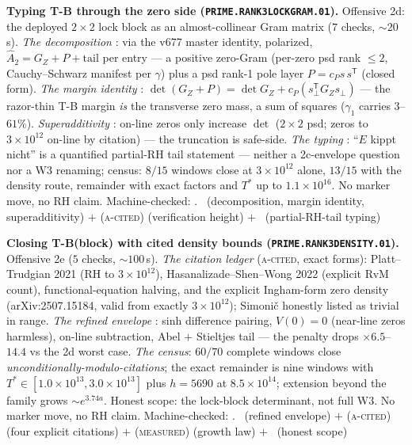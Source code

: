 \documentclass[11pt,a4paper]{article}
\theoremstyle{definition}
\begin{document}
\par\smallskip\noindent\textbf{Typing T-B through the zero side
(\texttt{PRIME.RANK3LOCKGRAM.01}).}
Offensive 2d: the deployed $2\times2$ lock block as an
almost-collinear Gram matrix ($7$ checks, ${\sim}20$\,s).  \emph{The
decomposition} \mE: via the v677 master identity, polarized,
$\hat A_2=G_Z+P+\mathrm{tail}$ per entry --- a positive zero-Gram
(per-zero psd rank $\le2$, Cauchy--Schwarz manifest per $\gamma$)
plus a psd rank-1 pole layer $P=c_Ps\,s^{\mathsf T}$ (closed form).
\emph{The margin identity} \mE:
$\det(G_Z+P)=\det G_Z+c_P(s_\perp^{\mathsf T}G_Zs_\perp)$ --- the
razor-thin T-B margin \emph{is} the transverse zero mass, a sum of
squares ($\gamma_1$ carries $3$--$61\%$).  \emph{Superadditivity}
\mE: on-line zeros only increase $\det$ ($2\times2$ psd; zeros to
$3\times10^{12}$ on-line by citation) --- the truncation is
safe-side.  \emph{The typing} \mC: ``$E$ kippt nicht'' is a
quantified partial-RH tail statement --- neither a 2c-envelope
question nor a W3 renaming; census: $8/15$ windows close at
$3\times10^{12}$ alone, $13/15$ with the density route, remainder
with exact factors and $T^*$ up to $1.1\times10^{16}$.  No marker
move, no RH claim.
Machine-checked: .
\mE\ (decomposition, margin identity, superadditivity) $+$
(\textsc{a-cited}) (verification height) $+$ \mC\ (partial-RH-tail
typing)
\par\smallskip

\par\smallskip\noindent\textbf{Closing T-B(block) with cited density
bounds (\texttt{PRIME.RANK3DENSITY.01}).}
Offensive 2e ($5$ checks, ${\sim}100$\,s).  \emph{The citation
ledger} (\textsc{a-cited}, exact forms): Platt--Trudgian 2021 (RH to
$3\times10^{12}$), Hasanalizade--Shen--Wong 2022 (explicit RvM
count), functional-equation halving, and the explicit Ingham-form
zero density (arXiv:2507.15184, valid from exactly
$3\times10^{12}$); Simoni\v{c} honestly listed as trivial in range.
\emph{The refined envelope} \mE: sinh difference pairing, $V(0)=0$
(near-line zeros harmless), on-line subtraction, Abel $+$ Stieltjes
tail --- the penalty drops $\times6.5$--$14.4$ vs the 2d worst case.
\emph{The census}: $60/70$ complete windows close
\emph{unconditionally-modulo-citations}; the exact remainder is nine
windows with $T^*\in[1.0\times10^{13},3.0\times10^{13}]$ plus
$h=5690$ at $8.5\times10^{14}$; extension beyond the family grows
${\sim}e^{3.74a}$.  Honest scope: the lock-block determinant, not
full W3.  No marker move, no RH claim.
Machine-checked: .
\mE\ (refined envelope) $+$ (\textsc{a-cited}) (four explicit
citations) $+$ (\textsc{measured}) (growth law) $+$ \mC\ (honest
scope)
\par\smallskip
\end{document}
